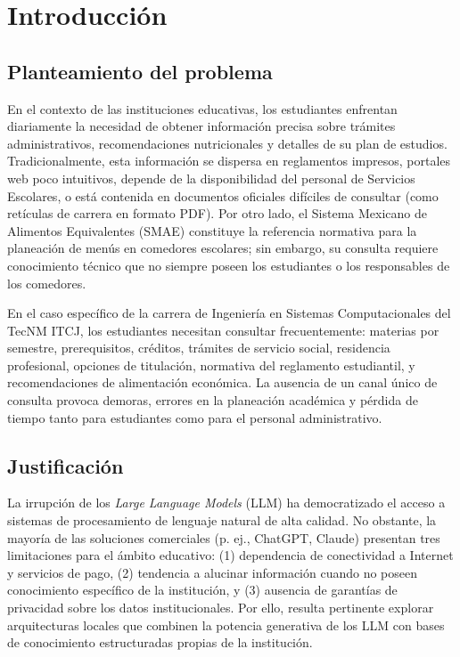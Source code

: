 \section{Introducción}
\label{sec:introduccion}

\subsection{Planteamiento del problema}

En el contexto de las instituciones educativas, los estudiantes enfrentan diariamente la necesidad de obtener información precisa sobre trámites administrativos, recomendaciones nutricionales y detalles de su plan de estudios. Tradicionalmente, esta información se dispersa en reglamentos impresos, portales web poco intuitivos, depende de la disponibilidad del personal de Servicios Escolares, o está contenida en documentos oficiales difíciles de consultar (como retículas de carrera en formato PDF). Por otro lado, el Sistema Mexicano de Alimentos Equivalentes (SMAE) constituye la referencia normativa para la planeación de menús en comedores escolares; sin embargo, su consulta requiere conocimiento técnico que no siempre poseen los estudiantes o los responsables de los comedores.

En el caso específico de la carrera de Ingeniería en Sistemas Computacionales del TecNM ITCJ, los estudiantes necesitan consultar frecuentemente: materias por semestre, prerequisitos, créditos, trámites de servicio social, residencia profesional, opciones de titulación, normativa del reglamento estudiantil, y recomendaciones de alimentación económica. La ausencia de un canal único de consulta provoca demoras, errores en la planeación académica y pérdida de tiempo tanto para estudiantes como para el personal administrativo.

\subsection{Justificación}

La irrupción de los \textit{Large Language Models} (LLM) ha democratizado el acceso a sistemas de procesamiento de lenguaje natural de alta calidad. No obstante, la mayoría de las soluciones comerciales (p. ej., ChatGPT, Claude) presentan tres limitaciones para el ámbito educativo: (1) dependencia de conectividad a Internet y servicios de pago, (2) tendencia a alucinar información cuando no poseen conocimiento específico de la institución, y (3) ausencia de garantías de privacidad sobre los datos institucionales. Por ello, resulta pertinente explorar arquitecturas locales que combinen la potencia generativa de los LLM con bases de conocimiento estructuradas propias de la institución.

